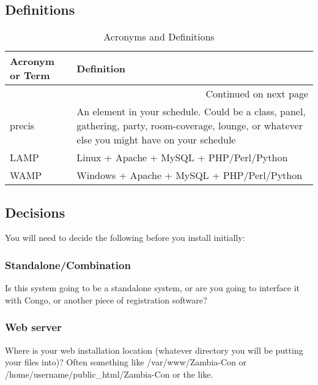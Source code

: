 \documentclass[captions=tablesignature]{scrartcl}
\begin{document}
\subsection{Definitions}
\label{sec-1-1}
\begin{longtable}{|p{3.5cm}|p{13.4cm}|}
\caption{\label{tbl:acronymsdefinitions}Acronyms and Definitions}
\\
\hline
Acronym or Term & Definition\\
\hline
\endhead
\hline\multicolumn{2}{r}{Continued on next page} \\
\endfoot
\endlastfoot
precis & An element in your schedule.  Could be a class, panel, gathering, party, room-coverage, lounge, or whatever else you might have on your schedule\\
LAMP & Linux + Apache + MySQL + PHP/Perl/Python\\
WAMP & Windows + Apache + MySQL + PHP/Perl/Python\\
\hline
\end{longtable}
\subsection{Decisions}
\label{sec-1-2}
You will need to decide the following before you install initially:
\subsubsection{Standalone/Combination}
\label{sec-1-2-1}
Is this system going to be a standalone system, or are you going
to interface it with Congo, or another piece of registration software?

\subsubsection{Web server}
\label{sec-1-2-2}
Where is your web installation location (whatever directory you
will be putting your files into)?  Often something like
/var/www/Zambia-Con or /home/username/public\_html/Zambia-Con or
the like.
\end{document}
